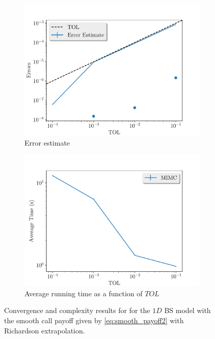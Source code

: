 \documentclass[11pt]{article}
\begin{document}
\begin{figure}[!h]
	\centering
	\begin{subfigure}{.5\textwidth}
		\centering
		\includegraphics[width=1\linewidth]{./figures/1D_BS_4_8_steps_smooth_second_payoff_eps_10_5_richardson/error_estimate.pdf}
		\caption{Error estimate}
		\label{fig:misc_1D_BS_4_8_steps_smooth_second_payoff_eps_10_5_sub1}
	\end{subfigure}%
	\begin{subfigure}{.5\textwidth}
		\centering
		\includegraphics[width=1\linewidth]{./figures/1D_BS_4_8_steps_smooth_second_payoff_eps_10_5_richardson/average_running_time.pdf}
		\caption{Average running time as a function of $TOL$}
		\label{fig:misc_1D_BS_4_8_steps_smooth_second_payoff_eps_10_5_sub2}
	\end{subfigure}%
	\caption{Convergence and complexity results for for the $1D$ BS model with the smooth call payoff given by \eqref{eq:smooth_payoff2} with Richardson extrapolation.}
	\label{fig:misc_1D_BS_4_8_steps_smooth_second_payoff_eps_10_5_1}
\end{figure}
\end{document}

